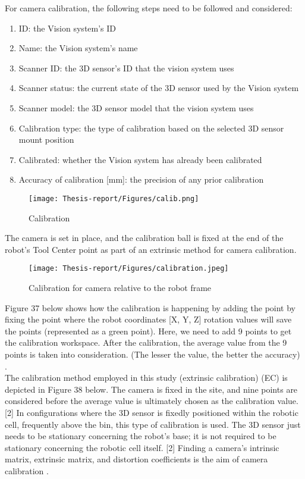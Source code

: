 \documentclass[12pt]{article}
\begin{document}
For camera calibration, the following steps need to be followed and considered: \cite{ref2}
\begin{enumerate}
    \item  ID: the Vision system's ID \cite{ref2}
    \item  Name: the Vision system's name \cite{ref2}
    \item  Scanner ID: the 3D sensor's ID that the vision system uses \cite{ref2}
    \item  Scanner status: the current state of the 3D sensor used by the Vision system\cite{ref2}
    \item  Scanner model: the 3D sensor model that the vision system uses \cite{ref2}
    \item  Calibration type: the type of calibration based on the selected 3D sensor mount position \cite{ref2}
    \item  Calibrated: whether the Vision system has already been calibrated \cite{ref2}
    \item  Accuracy of calibration [mm]: the precision of any prior calibration   \cite{ref2}
\end{enumerate}

\begin{figure}[h]
    \centering
    \texttt{[image: Thesis-report/Figures/calib.png]}
    \caption{Calibration \cite{ref2} }
    \label{fig:Photoneo Cmaera}
\end{figure}
The camera is set in place, and the calibration ball is fixed at the end of the robot's Tool Center point as part of an extrinsic method for camera calibration.\\
\begin{figure}[h]
    \centering
    \texttt{[image: Thesis-report/Figures/calibration.jpeg]}
    \caption{Calibration for camera relative to the robot frame\cite{ref2}} 
    \label{fig:Photoneo Cmaera}
\end{figure}
Figure 37 below shows how the calibration is happening by adding the point by fixing the point where the robot coordinates [X, Y, Z] rotation values will save the points (represented as a green point). Here, we need to add 9 points to get the calibration workspace. After the calibration, the average value from the 9 points is taken into consideration. (The lesser the value, the better the accuracy) \cite{ref2}.\\ 

The calibration method employed in this study (extrinsic calibration) (EC) is depicted in Figure 38 below. The camera is fixed in the site, and nine points are considered before the average value is ultimately chosen as the calibration value.  [2]  In configurations where the 3D sensor is fixedly positioned within the robotic cell, frequently above the bin, this type of calibration is used.  The 3D sensor just needs to be stationary concerning the robot's base; it is not required to be stationary concerning the robotic cell itself.  [2]  Finding a camera's intrinsic matrix, extrinsic matrix, and distortion coefficients is the aim of camera calibration \cite{ref2}.\\ 
\end{document}
